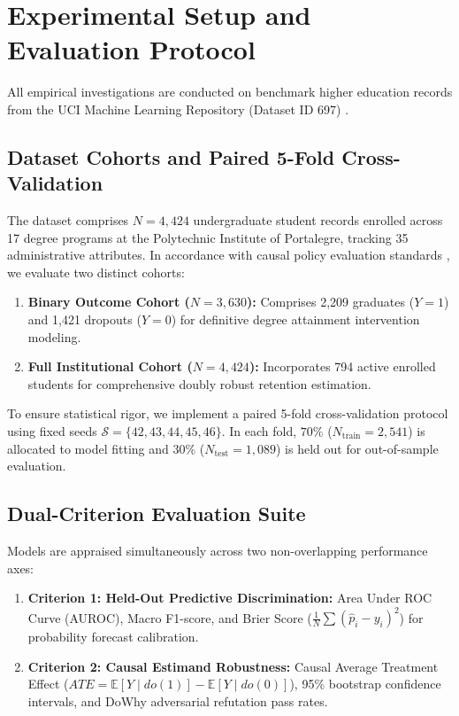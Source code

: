 \section{Experimental Setup and Evaluation Protocol}
\label{sec:exp_setup}

All empirical investigations are conducted on benchmark higher education records from the UCI Machine Learning Repository (Dataset ID 697) \parencite{martins2021predicting}.

\subsection{Dataset Cohorts and Paired 5-Fold Cross-Validation}

The dataset comprises $N = 4,424$ undergraduate student records enrolled across 17 degree programs at the Polytechnic Institute of Portalegre, tracking 35 administrative attributes. In accordance with causal policy evaluation standards \parencite{hernan2020causal}, we evaluate two distinct cohorts:
\begin{enumerate}
    \item \textbf{Binary Outcome Cohort ($N = 3,630$):} Comprises 2,209 graduates ($Y=1$) and 1,421 dropouts ($Y=0$) for definitive degree attainment intervention modeling.
    \item \textbf{Full Institutional Cohort ($N = 4,424$):} Incorporates 794 active enrolled students for comprehensive doubly robust retention estimation.
\end{enumerate}

To ensure statistical rigor, we implement a paired 5-fold cross-validation protocol using fixed seeds $\mathcal{S} = \{42, 43, 44, 45, 46\}$. In each fold, $70\%$ ($N_{\text{train}} = 2,541$) is allocated to model fitting and $30\%$ ($N_{\text{test}} = 1,089$) is held out for out-of-sample evaluation.

\subsection{Dual-Criterion Evaluation Suite}

Models are appraised simultaneously across two non-overlapping performance axes:
\begin{enumerate}
    \item \textbf{Criterion 1: Held-Out Predictive Discrimination:} Area Under ROC Curve (AUROC), Macro F1-score, and Brier Score ($\frac{1}{N}\sum (\hat{p}_i - y_i)^2$) for probability forecast calibration.
    \item \textbf{Criterion 2: Causal Estimand Robustness:} Causal Average Treatment Effect ($ATE = \mathbb{E}[Y \mid do(1)] - \mathbb{E}[Y \mid do(0)]$), 95\% bootstrap confidence intervals, and DoWhy adversarial refutation pass rates.
\end{enumerate}
